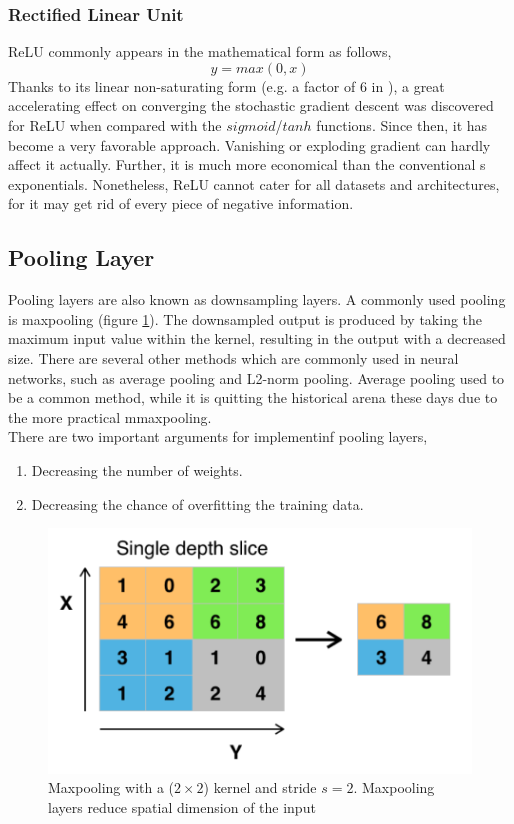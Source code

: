     \subsubsection{Rectified Linear Unit}
    ReLU commonly appears in the mathematical form as follows,
    \begin{equation}
        y = max(0, x)
    \end{equation}
    Thanks to its linear non-saturating form (e.g. a factor of 6 in \cite{krizhevsky2012imagenet}), a great accelerating effect on converging the stochastic gradient descent was discovered for ReLU when compared with the $sigmoid$/$tanh$ functions. Since then, it has become a very favorable approach. Vanishing or exploding gradient can hardly affect it actually. Further, it is much more economical than the conventional s  exponentials. Nonetheless, ReLU cannot cater for all datasets and architectures, for it may get rid of every piece of negative information.

    \subsection{Pooling Layer}
    Pooling layers are also known as downsampling layers. A commonly used pooling is maxpooling (figure \ref{maxpooling}). The downsampled output is produced by taking the maximum input value within the kernel, resulting in the output with a decreased size. There are several other methods which are commonly used in neural networks, such as average pooling and L2-norm pooling. Average pooling used to be a common method, while it is quitting the historical arena these days due to the more practical mmaxpooling\cite{scherer2010evaluation}.\\

    There are two important arguments for implementinf pooling layers,
    \begin{enumerate}
        \item Decreasing the number of weights.
        \item Decreasing the chance of overfitting the training data.
    \end{enumerate}
    \begin{figure}[!h]
        \centering
        \includegraphics[scale=0.5]{Figures/Max_pooling.pdf}
        \caption{Maxpooling with a ($2\times 2$) kernel and stride $s=2$. Maxpooling layers reduce spatial dimension of the input \cite{li2015convolutional}}
        \label{maxpooling}
    \end{figure}

